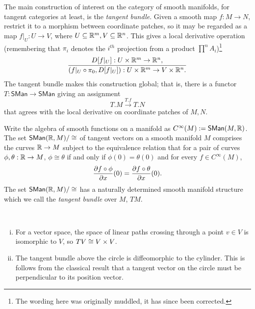 The main construction of interest on the category of smooth manifolds, for tangent categories at least, is the \emph{tangent bundle}. Given  a smooth map $f:M \to N$, restrict it to a morphism between coordinate patches, so it may be regarded as a map $f|_U: U \to V$, where $U \subseteq \mathbb{R}^m, V \subseteq \mathbb{R}^n$. This gives a local derivative operation (remembering that $\pi_i$ denotes the $i^{th}$ projection from a product $\prod^n A_i$)\footnote{
The wording here was originally muddled, it has since been corrected.
}
\begin{gather*}
    \infer{(f|_U \o \pi_0, D[f|_U]):U \x \R^m \to V \x \R^n.}{ D[f|_U]: U \x \R^m \to \R^n,}
\end{gather*}
The tangent bundle makes this construction global; that is, there is a functor $T:\mathsf{SMan \to SMan}$ giving an assignment \[T.M \xrightarrow{T.f} T.N\] that agrees with the local derivative on coordinate patches of $M, N$.

\begin{definition}%
    \label{def:tang-vector}
    Write the algebra of smooth functions on a manifold as $C^\infty(M):=\mathsf{SMan}(M,\mathbb{R})$.
    The set $\mathsf{SMan}(\mathbb{R}, M)/\cong$ of tangent vectors on a smooth manifold $M$ comprises the curves $\mathbb{R} \to M$ subject to the equivalence relation that for a pair of curves $\phi, \theta:\mathbb{R} \to M$, $\phi \cong \theta$ if and only if $\phi(0) = \theta(0)$ and for every $f \in C^\infty(M)$,
    \[
        \frac{\partial f \circ \phi}{\partial x}(0) = \frac{\partial f \circ \theta}{\partial x}(0).
    \] 
    The set $\mathsf{SMan}(\mathbb{R},M)/\cong$ has a naturally determined smooth manifold structure which we call the \emph{tangent bundle} over $M$, $TM$.
\end{definition}

\begin{example}
    ~\begin{enumerate}[(i)]
        \item For a vector space, the space of linear paths crossing through a point $v \in V$ is isomorphic to $V$, so $TV \cong V \times V$. 
        \item The tangent bundle above the circle is diffeomorphic to the cylinder. This is follows from the classical result that a tangent vector on the circle must be perpendicular to its position vector.
    \end{enumerate}
\end{example}


